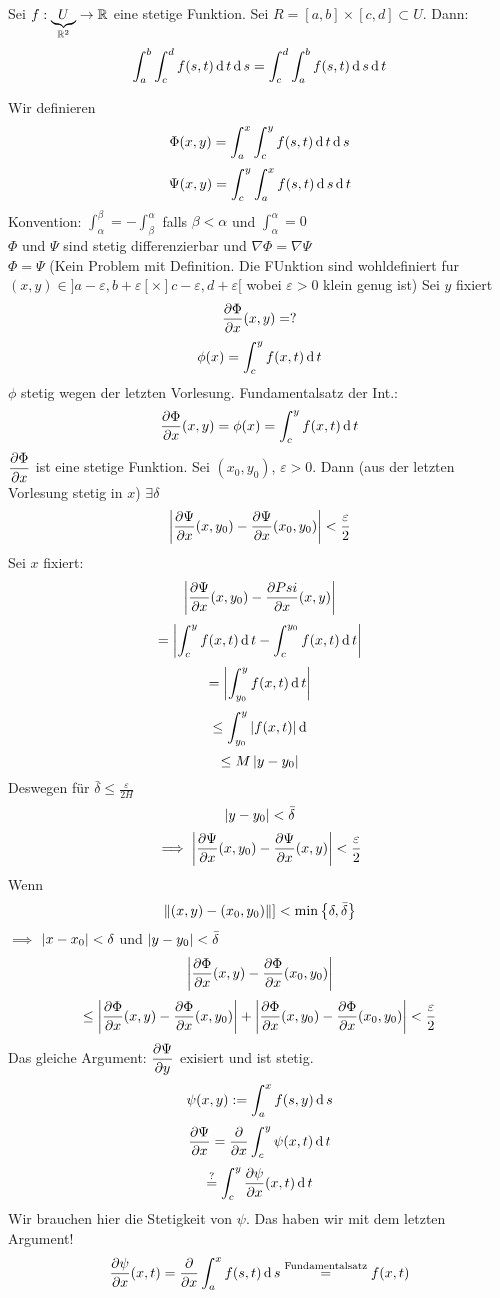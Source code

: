 \begin{Sat}
  Sei $f:\underbrace{U}_{\mathbb{R}^2}\rightarrow\mathbb{R}$ eine stetige Funktion. Sei $R=[a,b]\times [c,d]\subset U$. Dann:
  \[\int_a^b\int_c^d f(s,t)\operatorname{d} t\operatorname{d} s=\int_c^d\int_a^b f(s,t)\operatorname{d} s\operatorname{d} t\]
\end{Sat}
\begin{Bew}
  Wir definieren
  \[\Phi(x,y)=\int_a^x\int_c^yf(s,t)\operatorname{d} t\operatorname{d} s\]
  \[\Psi(x,y)=\int_c^y\int_a^x f(s,t)\operatorname{d} s\operatorname{d} t\]
  Konvention: $\int_\alpha^\beta = -\int_\beta^\alpha$ falls $\beta<\alpha$ und $\int_\alpha^\alpha=0$ \\
    $\Phi$ und $\Psi$ sind stetig differenzierbar und $\nabla \Phi = \nabla\Psi$ \\
    $\Phi=\Psi$ (Kein Problem mit Definition. Die FUnktion sind wohldefiniert fur $(x,y)\in ]a-\varepsilon,b+\varepsilon[\times ]c-\varepsilon,d+\varepsilon [$ wobei $\varepsilon>0$ klein genug ist)
  Sei $y$ fixiert
  \[\dfrac{\partial \Phi}{\partial x}(x,y) = ?\]
  \[\phi(x)=\int_c^yf(x,t)\operatorname{d} t\]
  $\phi$ stetig wegen der letzten Vorlesung. Fundamentalsatz der Int.:
  \[\dfrac{\partial \Phi}{\partial x}(x,y)=\phi(x)=\int_c^y f(x,t)\operatorname{d} t\]
    $\dfrac{\partial \Phi}{\partial x}$ ist eine stetige Funktion.
    Sei $(x_0,y_0)$, $\varepsilon>0$. Dann (aus der letzten Vorlesung stetig in $x$) $\exists \delta$
    \[\left| \dfrac{\partial \Psi}{\partial x}(x,y_0)-\dfrac{\partial \Psi}{\partial x}(x_0,y_0) \right|<\frac{\varepsilon}{2}\]
  Sei $x$ fixiert:
  \[\left| \dfrac{\partial \Psi}{\partial x}(x,y_0)-\dfrac{\partial Psi}{\partial x}(x,y) \right|\]
  \[=\left| \int_c^yf(x,t)\operatorname{d} t-\int_c^{y_0}f(x,t)\operatorname{d} t \right|\]
  \[=\left| \int_{y_0}^yf(x,t)\operatorname{d} t \right|\]
  \[\leq \int_{y_0}^y\left| f(x,t) \right|\operatorname{d}\]
  \[\leq M\left| y-y_0 \right|\]
  Deswegen
  für $\bar\delta \leq \frac{\varepsilon}{2H}$
  \[\left| y-y_0 \right|<\bar\delta\]
  \[\implies \left| \dfrac{\partial \Psi}{\partial x}(x,y_0)-\dfrac{\partial \Psi}{\partial x}(x,y) \right|<\frac{\varepsilon}{2}\]
  Wenn
  \[\left\| (x,y)-(x_0,y_0) \right\|]<\min \left\{ \delta,\bar\delta \right\} \]
  $\implies$ $\left| x-x_0 \right|<\delta$ und $\left| y-y_0 \right|<\bar\delta$
  \[\left| \dfrac{\partial \Phi}{\partial x}(x,y)-\dfrac{\partial \Phi}{\partial x}(x_0,y_0) \right|\]
  \[\leq \left| \dfrac{\partial \Phi}{\partial x}(x,y)-\dfrac{\partial \Phi}{\partial x}(x,y_0) \right|+\left| \dfrac{\partial \Phi}{\partial x}(x,y_0)-\dfrac{\partial \Phi}{\partial x}(x_0,y_0) \right|<\frac{\varepsilon}{2}\]
  Das gleiche Argument: $\dfrac{\partial \Psi}{\partial y}$ exisiert und ist stetig.
  \[\psi(x,y):=\int_a^xf(s,y)\operatorname{d} s\]
  \[\dfrac{\partial \Psi}{\partial x}=\dfrac{\partial }{\partial x}\int_c^y\psi(x,t)\operatorname{d} t\]
  \[\stackrel{?}{=}\int_c^y\dfrac{\partial \psi}{\partial x}(x,t)\operatorname{d} t\]
  Wir brauchen hier die Stetigkeit von $\psi$. Das haben wir mit dem letzten Argument!
  \begin{equation}
    \label{e:1104062}
    \Part{\psi}{x}(x,t)=\Part{}{x}\int_a^xf(s,t)\md s\stackrel{\text{Fundamentalsatz}}{=}f(x,t)

\end{equation}
\end{Bew}
